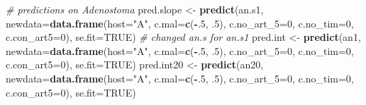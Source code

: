\documentclass[]{article}
\newenvironment{Shaded}{\begin{snugshade}}{\end{snugshade}}
\newcommand{\KeywordTok}[1]{\textcolor[rgb]{0.13,0.29,0.53}{\textbf{#1}}}
\newcommand{\DataTypeTok}[1]{\textcolor[rgb]{0.13,0.29,0.53}{#1}}
\newcommand{\DecValTok}[1]{\textcolor[rgb]{0.00,0.00,0.81}{#1}}
\newcommand{\StringTok}[1]{\textcolor[rgb]{0.31,0.60,0.02}{#1}}
\newcommand{\CommentTok}[1]{\textcolor[rgb]{0.56,0.35,0.01}{\textit{#1}}}
\newcommand{\OtherTok}[1]{\textcolor[rgb]{0.56,0.35,0.01}{#1}}
\newcommand{\OperatorTok}[1]{\textcolor[rgb]{0.81,0.36,0.00}{\textbf{#1}}}
\newcommand{\NormalTok}[1]{#1}
\begin{document}
\begin{Shaded}
\begin{Highlighting}[]
\CommentTok{# predictions on Adenostoma}
\NormalTok{pred.slope <-}\StringTok{ }\KeywordTok{predict}\NormalTok{(an.s1, }\DataTypeTok{newdata=}\KeywordTok{data.frame}\NormalTok{(}\DataTypeTok{host=}\StringTok{"A"}\NormalTok{, }\DataTypeTok{c.mal=}\KeywordTok{c}\NormalTok{(}\OperatorTok{-}\NormalTok{.}\DecValTok{5}\NormalTok{, .}\DecValTok{5}\NormalTok{), }\DataTypeTok{c.no_art_5=}\DecValTok{0}\NormalTok{, }\DataTypeTok{c.no_tim=}\DecValTok{0}\NormalTok{, }\DataTypeTok{c.con_art5=}\DecValTok{0}\NormalTok{), }\DataTypeTok{se.fit=}\OtherTok{TRUE}\NormalTok{) }\CommentTok{# changed an.s for an.s1}
\NormalTok{pred.int <-}\StringTok{ }\KeywordTok{predict}\NormalTok{(an1, }\DataTypeTok{newdata=}\KeywordTok{data.frame}\NormalTok{(}\DataTypeTok{host=}\StringTok{"A"}\NormalTok{, }\DataTypeTok{c.mal=}\KeywordTok{c}\NormalTok{(}\OperatorTok{-}\NormalTok{.}\DecValTok{5}\NormalTok{, .}\DecValTok{5}\NormalTok{), }\DataTypeTok{c.no_art_5=}\DecValTok{0}\NormalTok{, }\DataTypeTok{c.no_tim=}\DecValTok{0}\NormalTok{, }\DataTypeTok{c.con_art5=}\DecValTok{0}\NormalTok{), }\DataTypeTok{se.fit=}\OtherTok{TRUE}\NormalTok{)}
\NormalTok{pred.int20 <-}\StringTok{ }\KeywordTok{predict}\NormalTok{(an20, }\DataTypeTok{newdata=}\KeywordTok{data.frame}\NormalTok{(}\DataTypeTok{host=}\StringTok{"A"}\NormalTok{, }\DataTypeTok{c.mal=}\KeywordTok{c}\NormalTok{(}\OperatorTok{-}\NormalTok{.}\DecValTok{5}\NormalTok{, .}\DecValTok{5}\NormalTok{), }\DataTypeTok{c.no_art_5=}\DecValTok{0}\NormalTok{, }\DataTypeTok{c.no_tim=}\DecValTok{0}\NormalTok{, }\DataTypeTok{c.con_art5=}\DecValTok{0}\NormalTok{), }\DataTypeTok{se.fit=}\OtherTok{TRUE}\NormalTok{)}


\end{Highlighting}
\end{Shaded}
\end{document}
